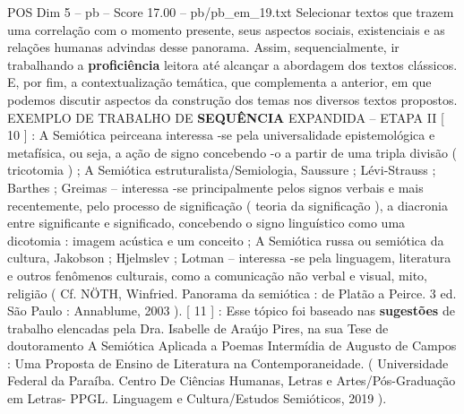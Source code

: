 \begin{textsample}{POS Dim 5 – pb – Score 17.00 – pb/pb\_em\_19.txt}
Selecionar textos que trazem uma correlação com o momento presente, seus aspectos sociais, existenciais e as relações humanas advindas desse panorama.
Assim, sequencialmente, ir trabalhando a \textbf{proficiência} leitora até alcançar a abordagem dos textos clássicos.
E, por fim, a contextualização temática, que complementa a anterior, em que podemos discutir aspectos da construção dos temas nos diversos textos propostos.
EXEMPLO DE TRABALHO DE \textbf{SEQUÊNCIA} EXPANDIDA – ETAPA II [ 10 ] : A Semiótica peirceana interessa -se pela universalidade epistemológica e metafísica, ou seja, a ação de signo concebendo -o a partir de uma tripla divisão ( tricotomia ) ; A Semiótica estruturalista/Semiologia, Saussure ; Lévi-Strauss ; Barthes ; Greimas – interessa -se principalmente pelos signos verbais e mais recentemente, pelo processo de significação ( teoria da significação ), a diacronia entre significante e significado, concebendo o signo linguístico como uma dicotomia : imagem acústica e um conceito ; A Semiótica russa ou semiótica da cultura, Jakobson ; Hjelmslev ; Lotman – interessa -se pela linguagem, literatura e outros fenômenos culturais, como a comunicação não verbal e visual, mito, religião ( Cf.
NÖTH, Winfried.
Panorama da semiótica : de Platão a Peirce. 3 ed.
São Paulo : Annablume, 2003 ). [ 11 ] : Esse tópico foi baseado nas \textbf{sugestões} de trabalho elencadas pela Dra.
Isabelle de Araújo Pires, na sua Tese de doutoramento A Semiótica Aplicada a Poemas Intermídia de Augusto de Campos : Uma Proposta de Ensino de Literatura na Contemporaneidade. ( Universidade Federal da Paraíba.
Centro De Ciências Humanas, Letras e Artes/Pós-Graduação em Letras- PPGL.
Linguagem e Cultura/Estudos Semióticos, 2019 ).

\end{textsample}
